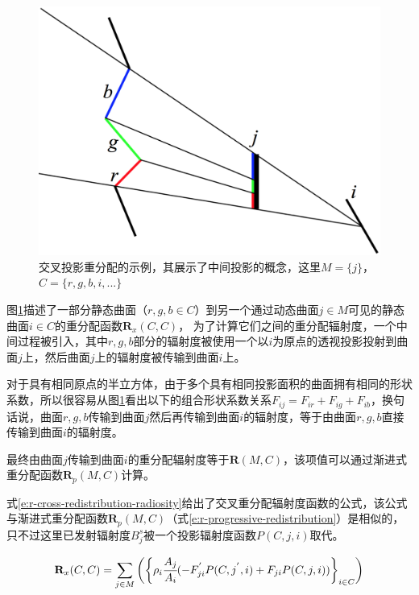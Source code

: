 \begin{figure}
\sidecaption
	\includegraphics[width=.5\textwidth]{figures/r/path-39}
	\caption{交叉投影重分配的示例，其展示了中间投影的概念，这里$M = \{j\}$，$C = \{r,g,b,i,...\}$}
	\label{f:r-c-c}
\end{figure}

图\ref{f:r-c-c}描述了一部分静态曲面（$r,g,b\in C$）到另一个通过动态曲面$j\in M$可见的静态曲面$i\in C$的重分配函数$\mathbf{R}_x(C,C)$， 为了计算它们之间的重分配辐射度，一个中间过程被引入，其中$r,g,b$部分的辐射度被使用一个以$i$为原点的透视投影投射到曲面$j$上，然后曲面$j$上的辐射度被传输到曲面$i$上。

对于具有相同原点的半立方体，由于多个具有相同投影面积的曲面拥有相同的形状系数，所以很容易从图\ref{f:r-c-c}看出以下的组合形状系数关系$F_{ij}=F_{ir}+F_{ig}+F_{ib}$，换句话说，曲面$r,g,b$传输到曲面$j$然后再传输到曲面$i$的辐射度，等于由曲面$r,g,b$直接传输到曲面$i$的辐射度。

最终由曲面$j$传输到曲面$i$的重分配辐射度等于$\mathbf{R}(M,C)$，该项值可以通过渐进式重分配函数$\mathbf{R}_p(M, C)$计算。

式\ref{e:r-cross-redistribution-radiosity}给出了交叉重分配辐射度函数的公式，该公式与渐进式重分配函数$\mathbf{R}_p(M,C)$（式\ref{e:r-progressive-redistribution}）是相似的，只不过这里已发射辐射度$B_j^{s}$被一个投影辐射度函数$P(C,j,i)$取代。

\begin{equation}\label{e:r-cross-redistribution-radiosity}
	\mathbf{R}_x(C,C)=\sum_{j\in M}\bigg(\bigg\{\rho_i \cfrac{A_j}{A_i}(-F^{'}_{ji}P(C,j^{'},i)+F_{ji}P(C,j,i))\bigg\}_{i\in C}\bigg)	
\end{equation}
